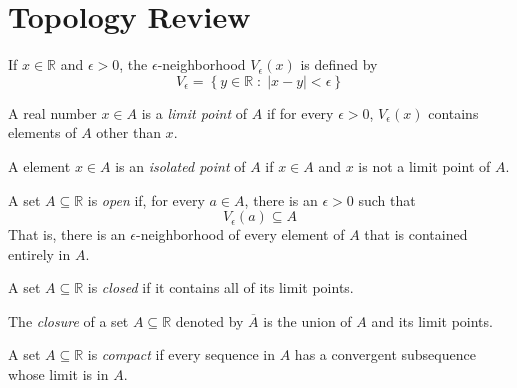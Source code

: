 \section*{Topology Review}
\begin{definition*} If $x\in\mathbb{R}$ and $\epsilon>0$, the $\epsilon$-neighborhood $V_{\epsilon}(x)$ is defined by 
\[
V_{\epsilon} = \left\{y\in\mathbb{R}\;:\; |x-y|<\epsilon\right\}
\]
\end{definition*}
\par\vspace{1 cm}
\begin{definition*} A real number $x\in A$ is a \textit{limit point} of $A$ if for every $\epsilon>0$, $V_{\epsilon}(x)$ contains elements of $A$ other than $x$.
\end{definition*}
\par\vspace{1 cm}
\begin{definition*} A element $x\in A$ is an \textit{isolated point} of $A$ if $x\in A$ and $x$ is not a limit point of $A$.
\end{definition*}
\par\vspace{1 cm}
\begin{definition*} A set $A\subseteq\mathbb{R}$ is \textit{open} if, for every $a\in A$, there is an $\epsilon>0$ such that
\[
V_{\epsilon}(a)\subseteq A
\]
That is, there is an $\epsilon$-neighborhood of every element of $A$ that is contained entirely in $A$.
\end{definition*}
\par\vspace{1 cm}
\begin{definition*} A set $A\subseteq\mathbb{R}$ is \textit{closed} if it contains all of its limit points.
\end{definition*}
\par\vspace{1 cm}
\begin{definition*}[closure] The \textit{closure} of a set $A\subseteq\mathbb{R}$ denoted by $\overline{A}$ is the union of $A$ and its limit points.
\end{definition*}
\par\vspace{1 cm}
\begin{definition*} A set $A\subseteq\mathbb{R}$ is \textit{compact} if every sequence in $A$ has a convergent subsequence whose limit is in $A$.
\end{definition*}
